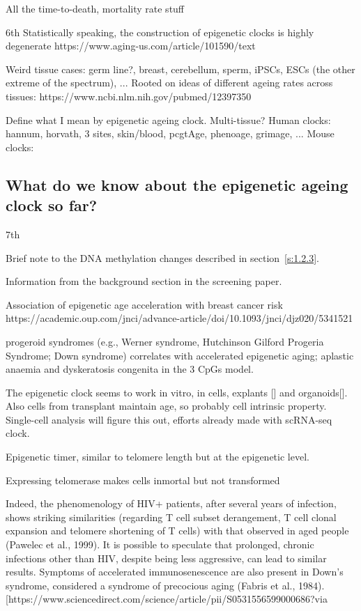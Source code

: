 All the time-to-death, mortality rate stuff

6th
Statistically speaking, the construction of epigenetic clocks is highly degenerate
https://www.aging-us.com/article/101590/text

Weird tissue cases: germ line?, breast, cerebellum, sperm, iPSCs, ESCs (the other extreme of the spectrum), ...
Rooted on ideas of different ageing rates across tissues:
https://www.ncbi.nlm.nih.gov/pubmed/12397350

Define what I mean by epigenetic ageing clock. Multi-tissue?
Human clocks: hannum, horvath, 3 sites, skin/blood, pcgtAge, phenoage, grimage, ... 
Mouse clocks:  \cite{Stubbs2017,Petkovich2017,Wang2017,Thompson2018,Meer2018}


\subsection{What do we know about the epigenetic ageing clock so far?}

7th

Brief note to the DNA methylation changes described in section~\ref{s:1.2.3}.

Information from the background section in the screening paper.

Association of epigenetic age acceleration with breast cancer risk https://academic.oup.com/jnci/advance-article/doi/10.1093/jnci/djz020/5341521

progeroid syndromes (e.g., Werner syndrome, Hutchinson Gilford Progeria Syndrome; Down syndrome) correlates with accelerated epigenetic aging; aplastic anaemia and dyskeratosis congenita in the 3 CpGs model.

The epigenetic clock seems to work in vitro, in cells, explants [] and organoids[]. Also cells from transplant maintain age, so probably cell intrinsic property. Single-cell analysis will figure this out, efforts already made with scRNA-seq clock.

Epigenetic timer, similar to telomere length but at the epigenetic level.

Expressing telomerase makes cells inmortal but not transformed 


Indeed, the phenomenology of HIV+ patients, after several years of infection, shows striking similarities (regarding T cell subset derangement, T cell clonal expansion and telomere shortening of T cells) with that observed in aged people (Pawelec et al., 1999). It is possible to speculate that prolonged, chronic infections other than HIV, despite being less aggressive, can lead to similar results. Symptoms of accelerated immunosenescence are also present in Down’s syndrome, considered a syndrome of precocious aging (Fabris et al., 1984). [https://www.sciencedirect.com/science/article/pii/S0531556599000686?via%

